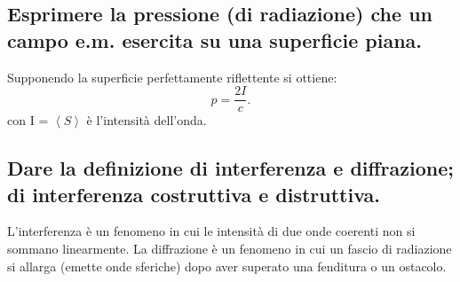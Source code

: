 \subsection[$\ $ Pressione di radiazione su una superficie piana]{Esprimere la pressione (di radiazione) che un campo e.m. esercita su una superficie piana.}
Supponendo la superficie perfettamente riflettente si ottiene:
\[
	p = \frac{2I}{c} 
.\] 
con I = $\left<S\right>$ è l'intensità dell'onda. 
\subsection[$\ $ Interferenza e diffrazione]{Dare la definizione di interferenza e diffrazione; di interferenza costruttiva e distruttiva.}
L'interferenza è un fenomeno in cui le intensità di due onde coerenti non si sommano linearmente. La diffrazione è un fenomeno in cui un fascio di radiazione si allarga (emette onde sferiche) dopo aver superato una fenditura o un ostacolo.

